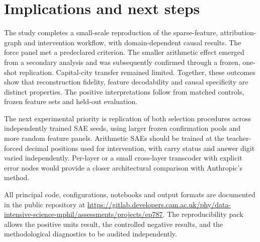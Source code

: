 \documentclass[11pt,a4paper]{article}
\begin{document}
\section*{Implications and next steps}

The study completes a small-scale reproduction of the sparse-feature, attribution-graph and intervention workflow, with domain-dependent causal results. The force panel met a predeclared criterion. The smaller arithmetic effect emerged from a secondary analysis and was subsequently confirmed through a frozen, one-shot replication. Capital-city transfer remained limited. Together, these outcomes show that reconstruction fidelity, feature decodability and causal specificity are distinct properties. The positive interpretations follow from matched controls, frozen feature sets and held-out evaluation.

The next experimental priority is replication of both selection procedures across independently trained SAE seeds, using larger frozen confirmation pools and more random feature panels. Arithmetic SAEs should be trained at the teacher-forced decimal positions used for intervention, with carry status and answer digit varied independently. Per-layer or a small cross-layer transcoder with explicit error nodes would provide a closer architectural comparison with Anthropic's method.

All principal code, configurations, notebooks and output formats are documented in the public repository at
\url{https://gitlab.developers.cam.ac.uk/phy/data-intensive-science-mphil/assessments/projects/ep787}. The reproducibility pack allows the positive units result, the controlled negative results, and the methodological diagnostics to be audited independently.
\end{document}
